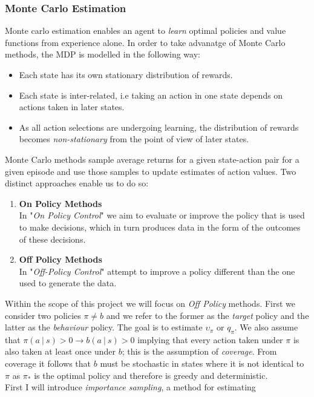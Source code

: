 \subsubsection{Monte Carlo Estimation}
Monte carlo estimation enables an agent to \emph{learn} optimal policies and value functions
from experience alone. In order to take advanatge of Monte Carlo methods, the MDP
is modelled in the following way:
\begin{itemize}
    \item Each state has its own stationary distribution of rewards.
    \item Each state is inter-related, i.e taking an action in one state depends on actions taken in later states.
    \item As all action selections are undergoing learning, the distribution of rewards becomes \emph{non-stationary}
    from the point of view of later states. 
\end{itemize}
Monte Carlo methods sample average returns for a given state-action pair for a given
episode and use those samples to update estimates of action values.
Two distinct approaches enable us to do so:
\begin{enumerate}
    \item \textbf{On Policy Methods} \\
        In "\emph{On Policy Control}" we aim to evaluate or improve
        the policy that is used to make decisions, which in turn produces data in the
        form of the outcomes of these decisions.
    \item \textbf{Off Policy Methods} \\
        In "\emph{Off-Policy Control}" attempt to improve a policy different than the
        one used to generate the data.
\end{enumerate}
Within the scope of this project we will focus on \emph{Off Policy} methods.
First we consider two policies $\pi \neq b$ and we refer to the former as the \emph{target}
policy and the latter as the \emph{behaviour} policy. The goal is to estimate $\upsilon_\pi$
or $q_\pi$. We also assume that $\pi(a\:|\:s) > 0 \rightarrow b(a \:|\:s) >0$ implying that 
every action taken under $\pi$ is also taken at least once under $b$; this is the assumption of \emph{coverage}.
From coverage it follows that $b$ must be stochastic in states where it is not identical to
$\pi$ as $\pi_*$ is the optimal policy and therefore is greedy and deterministic.\\
First I will introduce \emph{importance sampling}, a method for estimating
